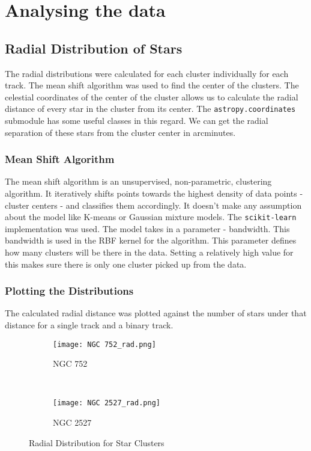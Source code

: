 \chapter{Analysing the data}\label{ch:ch3}

\section{Radial Distribution of Stars}
The radial distributions were calculated for each cluster individually for each track. The mean shift algorithm was used to find the center of the clusters. The celestial coordinates of the center of the cluster allows us to calculate the radial distance of every star in the cluster from its center. The \lstinline{astropy.coordinates} {}submodule has some useful classes in this regard. We can get the radial separation of these stars from the cluster center in arcminutes.

\subsection{Mean Shift Algorithm}
The mean shift algorithm is an unsupervised, non-parametric, clustering algorithm. It iteratively shifts points towards the highest density of data points - cluster centers - and classifies them accordingly. It doesn't make any assumption about the model like K-means or Gaussian mixture models. The \lstinline{scikit-learn} {}implementation was used. The model takes in a parameter - bandwidth. This bandwidth is used in the RBF kernel for the algorithm. This parameter defines how many clusters will be there in the data. Setting a relatively high value for this makes sure there is only one cluster picked up from the data. 

\subsection{Plotting the Distributions}
The calculated radial distance was plotted against the number of stars under that distance for a single track and a binary track. 

\begin{figure}[H]
\centering
\begin{subfigure}[b]{0.4\textwidth}
  \centering
  \texttt{[image: NGC 752\_rad.png]}
  \caption{NGC 752}
  \label{fig:im4}
 \end{subfigure}
~
\begin{subfigure}[b]{0.4\textwidth}
  \centering
  \texttt{[image: NGC 2527\_rad.png]}
  \caption{NGC 2527}
  \label{fig:im5}
\end{subfigure}
\caption{Radial Distribution for Star Clusters}
\label{fig:sim1}
\end{figure}

